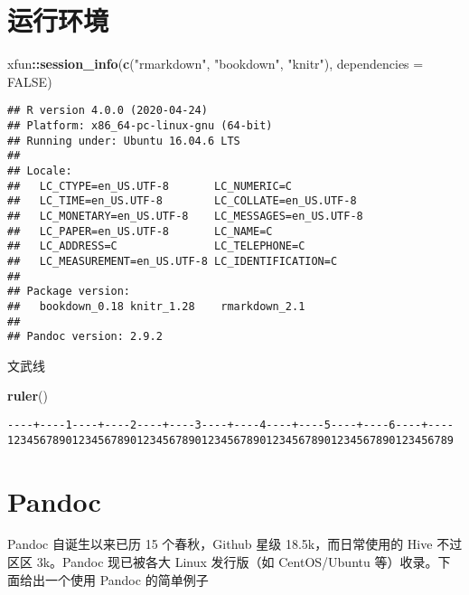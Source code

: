\documentclass[
  lang=cn,
  11pt,
  scheme=chinese,
  chinesefont=nofont,
  bibstyle=apalike]{elegantbook}
\newenvironment{Shaded}{\begin{snugshade}}{\end{snugshade}}
\newcommand{\DataTypeTok}[1]{\textcolor[rgb]{0.13,0.29,0.53}{#1}}
\newcommand{\KeywordTok}[1]{\textcolor[rgb]{0.13,0.29,0.53}{\textbf{#1}}}
\newcommand{\NormalTok}[1]{#1}
\newcommand{\OperatorTok}[1]{\textcolor[rgb]{0.81,0.36,0.00}{\textbf{#1}}}
\newcommand{\OtherTok}[1]{\textcolor[rgb]{0.56,0.35,0.01}{#1}}
\newcommand{\StringTok}[1]{\textcolor[rgb]{0.31,0.60,0.02}{#1}}
\begin{document}
\hypertarget{session-info}{%
\section{运行环境}\label{session-info}}

\begin{Shaded}
\begin{Highlighting}[]
\NormalTok{xfun}\OperatorTok{::}\KeywordTok{session\_info}\NormalTok{(}\KeywordTok{c}\NormalTok{(}\StringTok{"rmarkdown"}\NormalTok{, }\StringTok{"bookdown"}\NormalTok{, }\StringTok{"knitr"}\NormalTok{), }\DataTypeTok{dependencies =} \OtherTok{FALSE}\NormalTok{)}
\end{Highlighting}
\end{Shaded}

\begin{verbatim}
## R version 4.0.0 (2020-04-24)
## Platform: x86_64-pc-linux-gnu (64-bit)
## Running under: Ubuntu 16.04.6 LTS
## 
## Locale:
##   LC_CTYPE=en_US.UTF-8       LC_NUMERIC=C              
##   LC_TIME=en_US.UTF-8        LC_COLLATE=en_US.UTF-8    
##   LC_MONETARY=en_US.UTF-8    LC_MESSAGES=en_US.UTF-8   
##   LC_PAPER=en_US.UTF-8       LC_NAME=C                 
##   LC_ADDRESS=C               LC_TELEPHONE=C            
##   LC_MEASUREMENT=en_US.UTF-8 LC_IDENTIFICATION=C       
## 
## Package version:
##   bookdown_0.18 knitr_1.28    rmarkdown_2.1
## 
## Pandoc version: 2.9.2
\end{verbatim}

文武线

\begin{Shaded}
\begin{Highlighting}[]
\KeywordTok{ruler}\NormalTok{()}
\end{Highlighting}
\end{Shaded}

\begin{verbatim}
----+----1----+----2----+----3----+----4----+----5----+----6----+----
123456789012345678901234567890123456789012345678901234567890123456789
\end{verbatim}

\hypertarget{pandoc}{%
\section{Pandoc}\label{pandoc}}

Pandoc 自诞生以来已历 15 个春秋，Github 星级 18.5k，而日常使用的 Hive 不过区区 3k。Pandoc 现已被各大 Linux 发行版（如 CentOS/Ubuntu 等）收录。下面给出一个使用 Pandoc 的简单例子
\end{document}
